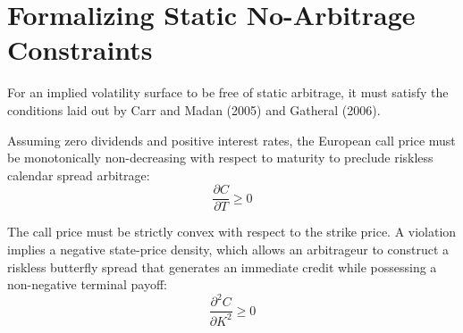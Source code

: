 \section{Formalizing Static No-Arbitrage Constraints}
For an implied volatility surface to be free of static arbitrage, it must satisfy the conditions laid out by Carr and Madan (2005) and Gatheral (2006).

\begin{proposition}
Assuming zero dividends and positive interest rates, the European call price must be monotonically non-decreasing with respect to maturity to preclude riskless calendar spread arbitrage:
$$\frac{\partial C}{\partial T} \geq 0$$
\end{proposition}

\begin{proposition}
The call price must be strictly convex with respect to the strike price. A violation implies a negative state-price density, which allows an arbitrageur to construct a riskless butterfly spread that generates an immediate credit while possessing a non-negative terminal payoff:
$$\frac{\partial^2 C}{\partial K^2} \geq 0$$
\end{proposition}

